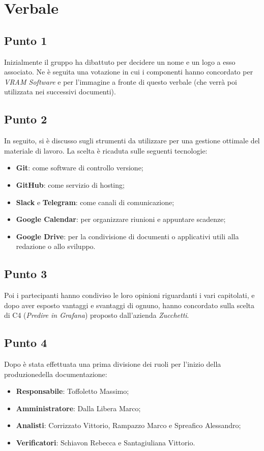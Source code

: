 \section{Verbale}
    \subsection{Punto 1}
        Inizialmente il gruppo ha dibattuto per decidere un nome e un logo a esso associato. Ne è seguita una votazione in cui i componenti hanno
        concordato per \textit{VRAM Software} e per l'immagine a fronte di questo verbale (che verrà poi utilizzata nei successivi documenti).
    \subsection{Punto 2}
        In seguito, si è discusso sugli strumenti da utilizzare per una gestione ottimale del materiale di lavoro. La scelta è ricaduta sulle seguenti tecnologie:
        \begin{itemize}
            \item \textbf{Git}: come software di controllo versione;
            \item \textbf{GitHub}: come servizio di hosting;
            \item \textbf{Slack} e \textbf{Telegram}: come canali di comunicazione;
            \item \textbf{Google Calendar}: per organizzare riunioni e appuntare scadenze;
            \item \textbf{Google Drive}: per la condivisione di documenti o applicativi utili alla redazione o allo sviluppo.
        \end{itemize}
    \subsection{Punto 3}
        Poi i partecipanti hanno condiviso le loro opinioni riguardanti i vari capitolati\glo, e dopo aver esposto vantaggi e svantaggi di ognuno, hanno concordato sulla scelta di C4 (\textit{Predire in Grafana}\glo) proposto dall'azienda \textit{Zucchetti}.
    \subsection{Punto 4}
        Dopo è stata effettuata una prima divisione dei ruoli per l'inizio della produzione\glosp della documentazione:
        \begin{itemize}
            \item \textbf{Responsabile}: Toffoletto Massimo;
            \item \textbf{Amministratore}: Dalla Libera Marco;
            \item \textbf{Analisti}: Corrizzato Vittorio, Rampazzo Marco e Spreafico Alessandro;
            \item \textbf{Verificatori}: Schiavon Rebecca e Santagiuliana Vittorio.
        \end{itemize}
